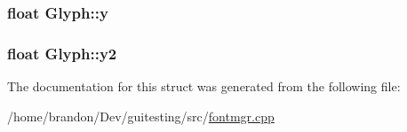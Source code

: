 \hypertarget{struct_glyph_d8642dd12bf3fb747bfe5096a4c8a2ba}{
\subsubsection[{y}]{\setlength{\rightskip}{0pt plus 5cm}float {\bf Glyph::y}}}
\label{struct_glyph_d8642dd12bf3fb747bfe5096a4c8a2ba}


\hypertarget{struct_glyph_30e23523e3b8b41ef12d8a31a5558456}{
\subsubsection[{y2}]{\setlength{\rightskip}{0pt plus 5cm}float {\bf Glyph::y2}}}
\label{struct_glyph_30e23523e3b8b41ef12d8a31a5558456}




The documentation for this struct was generated from the following file:\begin{CompactItemize}
\item 
/home/brandon/Dev/guitesting/src/\hyperlink{fontmgr_8cpp}{fontmgr.cpp}\end{CompactItemize}
